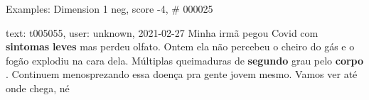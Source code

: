 \begin{frame}{Examples: Dimension 1 neg, score -4, \# 000025}
\footnotesize
\begin{alertblock}{text: t005055, user: unknown, 2021-02-27}
Minha irmã pegou Covid com \textbf{sintomas} \textbf{leves} mas perdeu olfato. 
Ontem ela não percebeu o cheiro do gás e o fogão explodiu na cara dela. 
Múltiplas queimaduras de \textbf{segundo} grau pelo \textbf{corpo} . Continuem 
menosprezando essa doença pra gente jovem mesmo. Vamos ver até onde chega, né 
\end{alertblock}
\end{frame}
